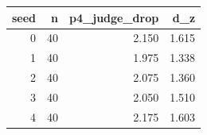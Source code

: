 \begin{tabular}{rrrr}
\toprule
seed & n & p4_judge_drop & d_z \\
\midrule
0 & 40 & 2.150 & 1.615 \\
1 & 40 & 1.975 & 1.338 \\
2 & 40 & 2.075 & 1.360 \\
3 & 40 & 2.050 & 1.510 \\
4 & 40 & 2.175 & 1.603 \\
\bottomrule
\end{tabular}
